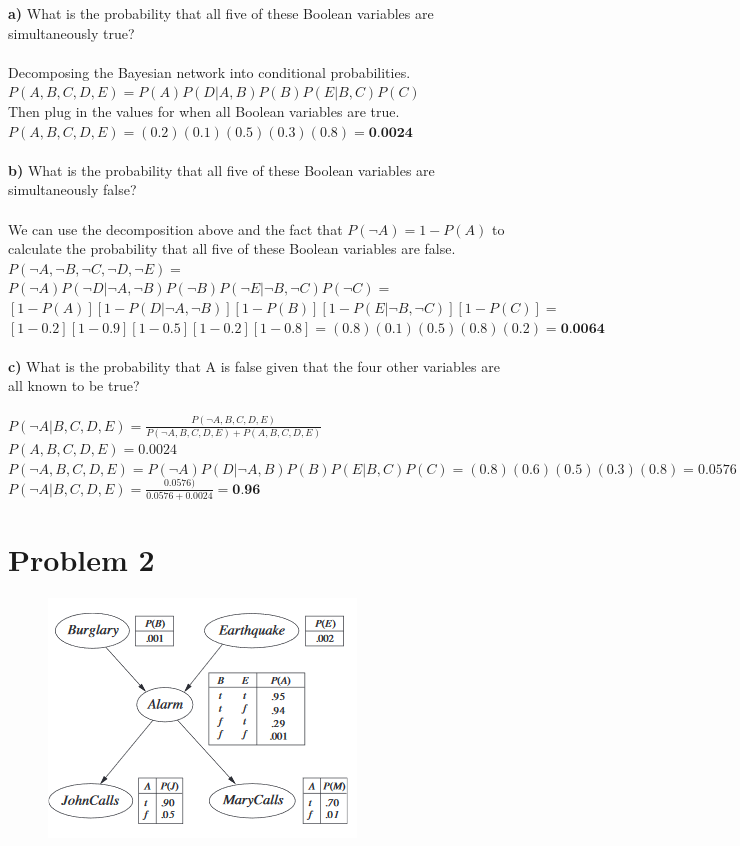 \documentclass{article}
\begin{document}
\noindent
\textbf{a)} What is the probability that all five of these Boolean variables are simultaneously true?
\\\\
Decomposing the Bayesian network into conditional probabilities.
\\ $P(A,B,C,D,E) = P(A)P(D|A,B)P(B)P(E|B,C)P(C)$ 
\\ Then plug in the values for when all Boolean variables are true.\\
$P(A,B,C,D,E) = (0.2)(0.1)(0.5)(0.3)(0.8) = \textbf{0.0024}$
\\\\
\textbf{b)} What is the probability that all five of these Boolean variables are simultaneously false?
\\\\
We can use the decomposition above and the fact that $P(\neg A) = 1-P(A)$ to calculate the probability that all five of these Boolean variables are false.\\
$P(\neg A,\neg B,\neg C,\neg D,\neg E) =$\\
$P(\neg A)P(\neg D|\neg A,\neg B)P(\neg B)P(\neg E|\neg B,\neg C)P(\neg C)=$\\
$[1-P(A)][1-P(D| \neg A,\neg B)][1-P(B)][1-P(E| \neg B, \neg C)][1-P(C)]=$\\
$[1-0.2][1-0.9][1-0.5][1-0.2][1-0.8]=(0.8)(0.1)(0.5)(0.8)(0.2)=\textbf{0.0064}$
\\\\
\textbf{c)} What is the probability that A is false given that the four other variables are all known to be true?\\\\
$P(\neg A|B,C,D,E) = \frac{P(\neg A,B,C,D,E)}{P(\neg A,B,C,D,E)+P(A,B,C,D,E)}$\\
$P(A,B,C,D,E)=0.0024$\\
$P(\neg A,B,C,D,E)=P(\neg A)P(D|\neg A,B)P(B)P(E|B,C)P(C)=(0.8)(0.6)(0.5)(0.3)(0.8)=0.0576$\\
$P(\neg A|B,C,D,E) = \frac{0.0576)}{0.0576+0.0024}=\textbf{0.96}$
\newpage
\section{Problem 2}
\begin{figure}[H]
\centering
\includegraphics{images/2.png}
\end{figure}
\end{document}

